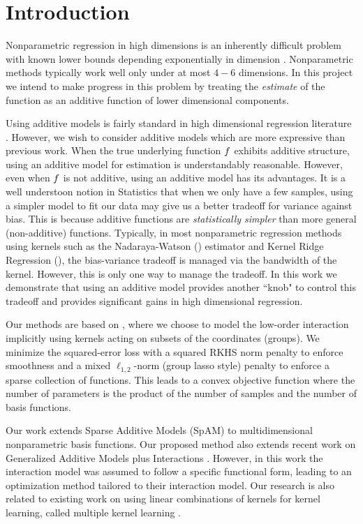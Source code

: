 

\section{Introduction}

Nonparametric regression in high dimensions is an inherently difficult problem with known
lower bounds depending exponentially in dimension
\citep{gyorfi02distributionfree}. 
Nonparametric methods typically work well only under at most $4-6$ dimensions.
In this project we intend to make progress in this problem by treating the
\emph{estimate} of the function as
an additive function of lower dimensional components.

Using additive models is fairly standard in high dimensional regression
literature \cite{hastie90gam,ravikumar09spam,lafferty05rodeo}. 
However, we wish to consider additive models which are more expressive than
previous work.
When the true underlying function $f$ exhibits additive structure, using an additive
model for estimation is understandably reasonable. However, even when $f$ is
not additive, using an additive model has its advantages. 
It is a well understoon notion in Statistics that when we only have a few samples, using a
simpler model to fit our data may give us a better tradeoff for variance 
against bias. This is because additive functions are \emph{statistically simpler}
than more general (non-additive) functions.
Typically, in most nonparametric regression methods using kernels such as the
Nadaraya-Watson
(\nw) estimator and Kernel Ridge Regression (\krr), the bias-variance tradeoff
is managed via the bandwidth of the kernel. However, this is only one way to
manage the tradeoff. In this work we demonstrate that using an additive model
provides another ``knob" to control this tradeoff and provides significant gains
in high dimensional regression.

Our methods are based on \krr, where
we choose to model the low-order interaction implicitly using kernels acting on
subsets of the coordinates (groups).
We minimize the squared-error loss with 
a squared RKHS norm penalty to enforce smoothness
and a mixed $\ell_{1,2}$-norm (group lasso style) penalty 
to enforce a sparse collection of functions.
This leads to a convex objective function where the number of parameters is
the product of the number of samples and the number of basis functions.

Our work extends Sparse Additive Models (SpAM) \citep{ravikumar09spam} 
to multidimensional nonparametric basis functions.
Our proposed method also extends recent work on 
Generalized Additive Models plus Interactions \citep{intelligible:2013}.
However, in this work the interaction model was assumed to follow a specific functional form,
leading to an optimization method tailored to their interaction model.
Our research is also related to existing work on 
using linear combinations of kernels for kernel learning,
called multiple kernel learning \citep{mkl-review:2011}.

